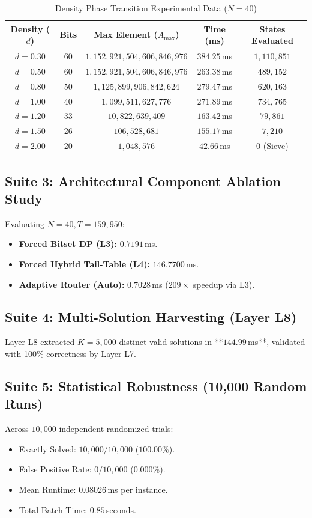 \documentclass[journal,onecolumn,11pt]{IEEEtran}
\begin{document}
\begin{table}[h]
\centering
\caption{Density Phase Transition Experimental Data ($N = 40$)}
\label{tab:density}
\renewcommand{\arraystretch}{1.15}
\begin{tabular}{ccccc}
\hline
Density ($d$) & Bits & Max Element ($A_{\max}$) & Time (ms) & States Evaluated \\
\hline
$d = 0.30$ & 60 & $1{,}152{,}921{,}504{,}606{,}846{,}976$ & $384.25$\,ms & $1{,}110{,}851$ \\
$d = 0.50$ & 60 & $1{,}152{,}921{,}504{,}606{,}846{,}976$ & $263.38$\,ms & $489{,}152$ \\
$d = 0.80$ & 50 & $1{,}125{,}899{,}906{,}842{,}624$ & $279.47$\,ms & $620{,}163$ \\
$d = 1.00$ & 40 & $1{,}099{,}511{,}627{,}776$ & $271.89$\,ms & $734{,}765$ \\
$d = 1.20$ & 33 & $10{,}822{,}639{,}409$ & $163.42$\,ms & $79{,}861$ \\
$d = 1.50$ & 26 & $106{,}528{,}681$ & $155.17$\,ms & $7{,}210$ \\
$d = 2.00$ & 20 & $1{,}048{,}576$ & $42.66$\,ms & $0$ (Sieve) \\
\hline
\end{tabular}
\end{table}

\subsection{Suite 3: Architectural Component Ablation Study}
Evaluating $N = 40, T = 159{,}950$:
\begin{itemize}
    \item \textbf{Forced Bitset DP (L3):} $0.7191$\,ms.
    \item \textbf{Forced Hybrid Tail-Table (L4):} $146.7700$\,ms.
    \item \textbf{Adaptive Router (Auto):} $0.7028$\,ms ($209\times$ speedup via L3).
\end{itemize}

\subsection{Suite 4: Multi-Solution Harvesting (Layer L8)}
Layer L8 extracted $K = 5{,}000$ distinct valid solutions in **$144.99$\,ms**, validated with 100\% correctness by Layer L7.

\subsection{Suite 5: Statistical Robustness (10,000 Random Runs)}
Across $10{,}000$ independent randomized trials:
\begin{itemize}
    \item Exactly Solved: $10{,}000 / 10{,}000$ ($100.00\%$).
    \item False Positive Rate: $0 / 10{,}000$ ($0.000\%$).
    \item Mean Runtime: $0.08026$\,ms per instance.
    \item Total Batch Time: $0.85$\,seconds.
\end{itemize}
\end{document}
